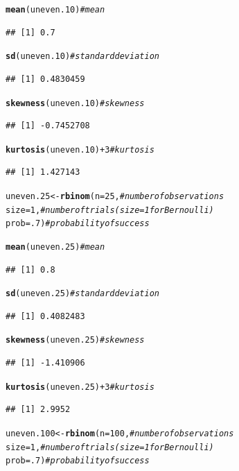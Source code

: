 \documentclass{article}\usepackage[]{graphicx}\usepackage[]{color}
\makeatletter
\newcommand{\hlnum}[1]{\textcolor[rgb]{0.686,0.059,0.569}{#1}}%
\newcommand{\hlcom}[1]{\textcolor[rgb]{0.678,0.584,0.686}{\textit{#1}}}%
\newcommand{\hlopt}[1]{\textcolor[rgb]{0,0,0}{#1}}%
\newcommand{\hlstd}[1]{\textcolor[rgb]{0.345,0.345,0.345}{#1}}%
\newcommand{\hlkwb}[1]{\textcolor[rgb]{0.69,0.353,0.396}{#1}}%
\newcommand{\hlkwc}[1]{\textcolor[rgb]{0.333,0.667,0.333}{#1}}%
\newcommand{\hlkwd}[1]{\textcolor[rgb]{0.737,0.353,0.396}{\textbf{#1}}}%
\newenvironment{kframe}{%
 \def\at@end@of@kframe{}%
 \ifinner\ifhmode%
  \def\at@end@of@kframe{\end{minipage}}%
  \begin{minipage}{\columnwidth}%
 \fi\fi%
 \def\FrameCommand##1{\hskip\@totalleftmargin \hskip-\fboxsep
 \colorbox{shadecolor}{##1}\hskip-\fboxsep
     \hskip-\linewidth \hskip-\@totalleftmargin \hskip\columnwidth}%
 \MakeFramed {\advance\hsize-\width
   \@totalleftmargin\z@ \linewidth\hsize
   \@setminipage}}%
 {\par\unskip\endMakeFramed%
 \at@end@of@kframe}
\newenvironment{knitrout}{}{} %
\makeatother
\begin{document}
\begin{enumerate}
\begin{enumerate}
\begin{knitrout}
\begin{kframe}
\begin{alltt}
\hlkwd{mean}\hlstd{(uneven.10)}                  \hlcom{#mean}
\end{alltt}
\begin{verbatim}
## [1] 0.7
\end{verbatim}
\begin{alltt}
\hlkwd{sd}\hlstd{(uneven.10)}                    \hlcom{#standard deviation}
\end{alltt}
\begin{verbatim}
## [1] 0.4830459
\end{verbatim}
\begin{alltt}
\hlkwd{skewness}\hlstd{(uneven.10)}              \hlcom{#skewness}
\end{alltt}
\begin{verbatim}
## [1] -0.7452708
\end{verbatim}
\begin{alltt}
\hlkwd{kurtosis}\hlstd{(uneven.10)}\hlopt{+}\hlnum{3}            \hlcom{#kurtosis}
\end{alltt}
\begin{verbatim}
## [1] 1.427143
\end{verbatim}
\begin{alltt}
\hlstd{uneven.25}  \hlkwb{<-} \hlkwd{rbinom}\hlstd{(}\hlkwc{n}\hlstd{=}\hlnum{25}\hlstd{,}       \hlcom{#number of observations}
                   \hlkwc{size}\hlstd{=}\hlnum{1}\hlstd{,}       \hlcom{#number of trials (size=1 for Bernoulli)}
                   \hlkwc{prob}\hlstd{=}\hlnum{.7}\hlstd{)}      \hlcom{#probability of success}

\hlkwd{mean}\hlstd{(uneven.25)}                  \hlcom{#mean}
\end{alltt}
\begin{verbatim}
## [1] 0.8
\end{verbatim}
\begin{alltt}
\hlkwd{sd}\hlstd{(uneven.25)}                    \hlcom{#standard deviation}
\end{alltt}
\begin{verbatim}
## [1] 0.4082483
\end{verbatim}
\begin{alltt}
\hlkwd{skewness}\hlstd{(uneven.25)}              \hlcom{#skewness}
\end{alltt}
\begin{verbatim}
## [1] -1.410906
\end{verbatim}
\begin{alltt}
\hlkwd{kurtosis}\hlstd{(uneven.25)}\hlopt{+}\hlnum{3}            \hlcom{#kurtosis}
\end{alltt}
\begin{verbatim}
## [1] 2.9952
\end{verbatim}
\begin{alltt}
\hlstd{uneven.100} \hlkwb{<-} \hlkwd{rbinom}\hlstd{(}\hlkwc{n}\hlstd{=}\hlnum{100}\hlstd{,}      \hlcom{#number of observations}
                   \hlkwc{size}\hlstd{=}\hlnum{1}\hlstd{,}       \hlcom{#number of trials (size=1 for Bernoulli)}
                   \hlkwc{prob}\hlstd{=}\hlnum{.7}\hlstd{)}      \hlcom{#probability of success}


\end{alltt}
\end{kframe}
\end{knitrout}
\end{enumerate}
\end{enumerate}
\end{document}
